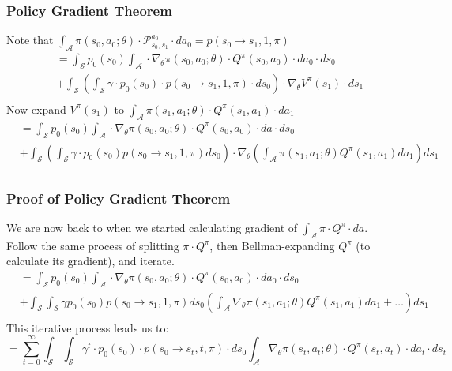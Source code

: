 \documentclass[handout]{beamer}
\begin{document}
\begin{frame}
\frametitle{Policy Gradient Theorem}
\pause
Note that $\int_{\mathcal{A}} \pi(s_0, a_0; \theta) \cdot \mathcal{P}_{s_0,s_1}^{a_0} \cdot d{a_0} = p(s_0 \rightarrow s_1, 1, \pi)$
\pause
\begin{align*}
& = \int_{\mathcal{S}} p_0(s_0) \int_{\mathcal{A}} \cdot \nabla_{\theta} \pi(s_0, a_0; \theta) \cdot Q^{\pi}(s_0, a_0) \cdot da_0 \cdot ds_0 \\
& + \int_{\mathcal{S}} (\int_{\mathcal{S}} \gamma \cdot p_0(s_0) \cdot p(s_0 \rightarrow s_1, 1, \pi) \cdot ds_0) \cdot  \nabla_{\theta} V^{\pi}(s_1) \cdot ds_1\\
\end{align*}
\pause
Now expand $V^{\pi}(s_1)$ to $\int_{\mathcal{A}} \pi(s_1, a_1; \theta) \cdot Q^{\pi}(s_1,a_1) \cdot da_1$
\pause
\begin{align*}
& = \int_{\mathcal{S}} p_0(s_0) \int_{\mathcal{A}} \cdot \nabla_{\theta} \pi(s_0, a_0; \theta) \cdot Q^{\pi}(s_0, a_0) \cdot da \cdot ds_0 \\
& + \int_{\mathcal{S}} (\int_{\mathcal{S}} \gamma \cdot p_0(s_0) p(s_0 \rightarrow s_1, 1, \pi) ds_0) \cdot \nabla_{\theta} (\int_{\mathcal{A}} \pi(s_1, a_1; \theta) Q^{\pi}(s_1,a_1) da_1) ds_1\\
\end{align*}
\end{frame}

\begin{frame}
\frametitle{Proof of Policy Gradient Theorem}
\pause
We are now back to when we started calculating gradient of $\int_{\mathcal{A}} \pi \cdot Q^{\pi} \cdot da$.\\
\pause
Follow the same process of splitting $\pi \cdot Q^{\pi}$, then Bellman-expanding $Q^{\pi}$ (to calculate its gradient), and iterate.
\pause
\begin{align*}
& = \int_{\mathcal{S}} p_0(s_0) \int_{\mathcal{A}} \cdot \nabla_{\theta} \pi(s_0, a_0; \theta) \cdot Q^{\pi}(s_0, a_0) \cdot da_0 \cdot ds_0 \\
& + \int_{\mathcal{S}} \int_{\mathcal{S}} \gamma p_0(s_0) p(s_0 \rightarrow s_1, 1, \pi) ds_0 (\int_{\mathcal{A}} \nabla_{\theta} \pi(s_1, a_1; \theta) Q^{\pi}(s_1,a_1) da_1 + \ldots)ds_1\\
\end{align*}
\pause
This iterative process leads us to:
$$= \sum_{t=0}^\infty \int_{\mathcal{S}} \int_{\mathcal{S}} \gamma^t \cdot p_0(s_0) \cdot p(s_0 \rightarrow s_t, t, \pi) \cdot ds_0 \int_{\mathcal{A}}\nabla_{\theta} \pi(s_t, a_t; \theta) \cdot Q^{\pi}(s_t,a_t) \cdot da_t \cdot ds_t$$
\end{frame}
\end{document}
